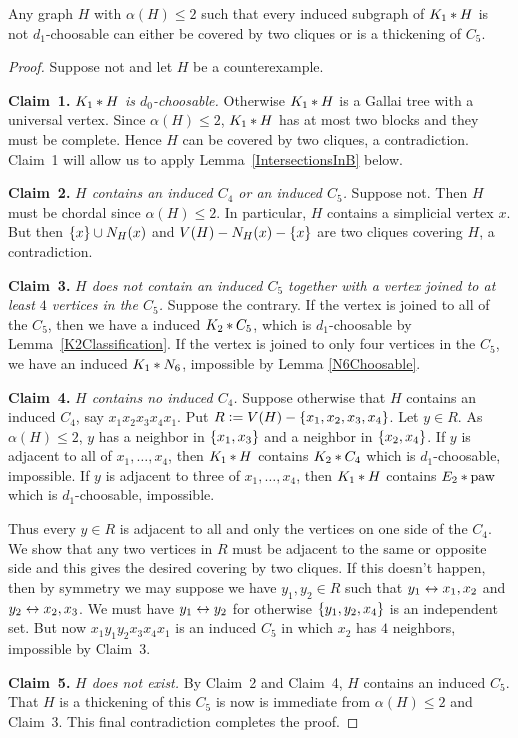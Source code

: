 \begin{lem}\label{BisimplicialOrThickC5}
Any graph $H$ with $\alpha(H) \leq 2$ such that every
induced subgraph of $K_1 \mbox{\hspace{2 pt}$\ast$\hspace{2 pt}} H$ is not $d_1$-choosable can either be covered
by two cliques or is a thickening of $C_5$.
\end{lem}
\begin{proof}
Suppose not and let $H$ be a counterexample.

\textbf{Claim~1.} \textit{$K_1 \mbox{\hspace{2 pt}$\ast$\hspace{2 pt}} H$ is $d_0$-choosable.}
Otherwise $K_1 \mbox{\hspace{2 pt}$\ast$\hspace{2 pt}} H$ is a Gallai tree with a universal vertex.  Since
$\alpha(H)\le 2$,
$K_1 \mbox{\hspace{2 pt}$\ast$\hspace{2 pt}} H$ has at most two blocks and they must be complete. Hence $H$ can
be covered by two cliques, a contradiction.  Claim~1 will allow us to apply
Lemma~\ref{IntersectionsInB} below.

\textbf{Claim~2.} \textit{$H$ contains an induced $C_4$ or an induced $C_5$.}
Suppose not.  Then $H$ must be chordal since $\alpha(H) \leq 2$.  In particular,
$H$ contains a simplicial vertex $x$.  But then $\left\{ x \right\} \cup N_H(x)$ and $V(H)
- N_H(x) - \left\{ x \right\}$ are two cliques covering $H$, a contradiction.

\textbf{Claim~3.} \textit{$H$ does not contain an induced $C_5$ together with a vertex joined to at least
$4$ vertices in the $C_5$.}
Suppose the contrary.  If the vertex is joined to all of the $C_5$, then we have
a induced $K_2 \mbox{\hspace{2 pt}$\ast$\hspace{2 pt}} C_5$, which is $d_1$-choosable by
Lemma~\ref{K2Classification}. If the vertex is joined to only four vertices in
the $C_5$, we have an induced $K_1 \mbox{\hspace{2 pt}$\ast$\hspace{2 pt}} N_6$, impossible by Lemma
\ref{N6Choosable}.

\textbf{Claim~4.} \textit{$H$ contains no induced $C_4$.}
Suppose otherwise that $H$ contains an induced $C_4$, say $x_1x_2x_3x_4x_1$. 
Put $R \mathrel{\mathop:}= V(H) - \left\{ x_1, x_2, x_3, x_4 \right\}$.  Let $y \in R$. As
$\alpha(H) \leq 2$, $y$ has a neighbor in $\left\{ x_1, x_3 \right\}$ and a neighbor in
$\left\{ x_2, x_4 \right\}$.  If $y$ is adjacent to all of $x_1, \ldots, x_4$, then
$K_1 \mbox{\hspace{2 pt}$\ast$\hspace{2 pt}} H$ contains $K_2 \mbox{\hspace{2 pt}$\ast$\hspace{2 pt}} C_4$ which is $d_1$-choosable, impossible.
If $y$ is adjacent to three of $x_1, \ldots, x_4$, then $K_1 \mbox{\hspace{2 pt}$\ast$\hspace{2 pt}} H$ contains
$E_2 \mbox{\hspace{2 pt}$\ast$\hspace{2 pt}} \text{paw}$ which is $d_1$-choosable, impossible.

Thus every $y \in R$ is adjacent to all and only the vertices on one side of the
$C_4$.  We show that any two vertices in $R$ must be adjacent to the same or
opposite side and this gives the desired covering by two cliques.  If this
doesn't happen, then by symmetry we may suppose we have $y_1, y_2 \in R$ such
that $y_1 \leftrightarrow x_1, x_2$ and $y_2 \leftrightarrow x_2, x_3$.  We must have $y_1 \leftrightarrow y_2$
for otherwise $\left\{ y_1, y_2, x_4 \right\}$ is an independent set.  But now $x_1y_1
y_2x_3x_4x_1$ is an induced $C_5$ in which $x_2$ has $4$ neighbors, impossible
by Claim~3.

\textbf{Claim~5.} \textit{$H$ does not exist.}
By Claim~2 and Claim~4, $H$ contains an induced
$C_5$. That $H$ is a thickening of this $C_5$ is now is immediate from
$\alpha(H) \leq 2$ and Claim~3.  This final contradiction
completes the proof.
\end{proof}

